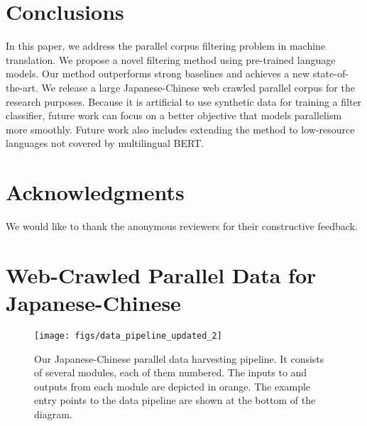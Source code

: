 \documentclass[11pt,a4paper]{article}
\begin{document}
 \section{Conclusions}

In this paper, we address the parallel corpus filtering problem in machine translation. We propose a novel filtering method using pre-trained language models. Our method outperforms strong baselines and achieves a new state-of-the-art. We release a large Japanese-Chinese web crawled parallel corpus for the research purposes. Because it is artificial to use synthetic data for training a filter classifier, future work can focus on a better objective that models parallelism more smoothly. Future work also includes extending the method to low-resource languages not covered by multilingual BERT.



%
 
\section*{Acknowledgments}
We would like to thank the anonymous reviewers for their constructive feedback. 




\clearpage
\newpage
\appendix
\onecolumn
\section{Web-Crawled Parallel Data for Japanese-Chinese}
\label{sec:appendix}


\begin{figure*}[h]
    \centering
    \texttt{[image: figs/data\_pipeline\_updated\_2]}
    \caption{Our Japanese-Chinese parallel data harvesting pipeline. It consists of several modules, each of them numbered. The inputs to and outputs from each module are depicted in orange. The example entry points to the data pipeline are shown at the bottom of the diagram.}
    \label{fig:data_pipeline}
\end{figure*}
\end{document}
